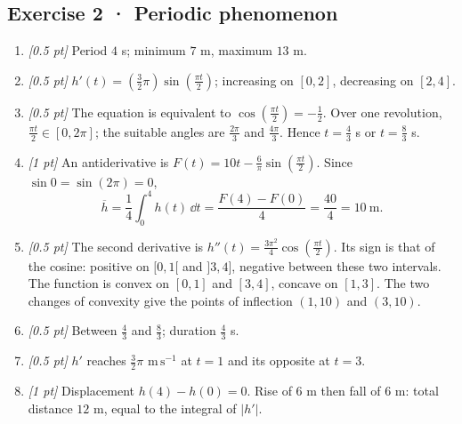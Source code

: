 \subsection*{Exercise 2 · Periodic phenomenon}\begin{enumerate}

\item \textit{[0.5 pt]} Period $4$ s; minimum $7$ m, maximum $13$ m.

\item \textit{[0.5 pt]} $h'(t)=(\frac{3}{2}\pi)\sin (\frac{\pi t}{2})$; increasing on $[0,2]$, decreasing on $[2,4]$.

\item \textit{[0.5 pt]} The equation is equivalent to $\cos (\frac{\pi t}{2})=-\frac{1}{2}$. Over one revolution, $\frac{\pi t}{2}\in[0,2\pi]$; the suitable angles are $\frac{2\pi}{3}$ and $\frac{4\pi}{3}$. Hence $t=\frac{4}{3}$ s or $t=\frac{8}{3}$ s.

\item \textit{[1 pt]} An antiderivative is $F(t)=10t-\frac{6}{\pi}\sin (\frac{\pi t}{2})$. Since $\sin0=\sin(2\pi)=0$,
\[\overline h=\frac{1}{4}\int_0^{4}h(t)\,\dd t=\frac{F(4)-F(0)}{4}=\frac{40}{4}=10\ \mathrm{m}.\]

\item \textit{[0.5 pt]} The second derivative is $h''(t)=\frac{3\pi^2}{4}\cos (\frac{\pi t}{2})$. Its sign is that of the cosine: positive on $[0,1[$ and $]3,4]$, negative between these two intervals. The function is convex on $[0,1]$ and $[3,4]$, concave on $[1,3]$. The two changes of convexity give the points of inflection $(1,10)$ and $(3,10)$.

\item \textit{[0.5 pt]} Between $\frac{4}{3}$ and $\frac{8}{3}$; duration $\frac{4}{3}$ s.

\item \textit{[0.5 pt]} $h'$ reaches $\frac{3}{2}\pi$ $\mathrm{m\,s^{-1}}$ at $t=1$ and its opposite at $t=3$.

\item \textit{[1 pt]} Displacement $h(4)-h(0)=0$. Rise of $6$ m then fall of $6$ m: total distance $12$ m, equal to the integral of $|h'|$.

\end{enumerate}

